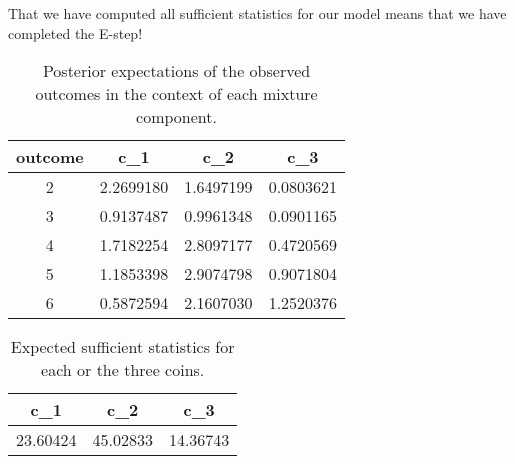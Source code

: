 \documentclass[a4paper,11pt,leqno]{report}\usepackage[]{graphicx}\usepackage[]{color}
\begin{document}
That we have computed all sufficient statistics
for our model means that we have completed the E-step!

\begin{table}
\center

\begin{tabular}{c|c|c|c}
\hline
outcome & c\_1 & c\_2 & c\_3\\
\hline
2 & 2.2699180 & 1.6497199 & 0.0803621\\
\hline
3 & 0.9137487 & 0.9961348 & 0.0901165\\
\hline
4 & 1.7182254 & 2.8097177 & 0.4720569\\
\hline
5 & 1.1853398 & 2.9074798 & 0.9071804\\
\hline
6 & 0.5872594 & 2.1607030 & 1.2520376\\
\hline
\end{tabular}


\caption{Posterior expectations of the observed outcomes in the context of each mixture component.}
\label{tab:binomCounts}
\end{table}

\begin{table}
\center 

\begin{tabular}{c|c|c}
\hline
c\_1 & c\_2 & c\_3\\
\hline
23.60424 & 45.02833 & 14.36743\\
\hline
\end{tabular}


\caption{Expected sufficient statistics for each or the three coins.}
\label{tab:binomPosteriors}
\end{table}
\end{document}
